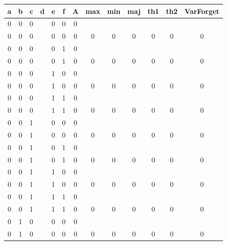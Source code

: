 \begin{table}[!tb]
    \centering
    \begin{tabular}{|c|c|c|c|c|c|c|c|c|c|c|c|c|}
        \hline
        \textbf{a} & \textbf{b} & \textbf{c} & \textbf{d} & \textbf{e} & \textbf{f} & \textbf{A} & \textbf{max} & \textbf{min} & \textbf{maj} & \textbf{th1} & \textbf{th2} & \textbf{VarForget} \\ \hline
        \rowcolor{gray!40} 0 & 0 & 0 &  & 0 & 0 & 0 &  &  &  &  &  &  \\ \hline
        \rowcolor{gray!40} 0 & 0 & 0 &  & 0 & 0 & 0 & 0 & 0 & 0 & 0 & 0 & 0 \\ \hline
        \rowcolor{blue!40} 0 & 0 & 0 &  & 0 & 1 & 0 &  &  &  &  &  &  \\ \hline
        \rowcolor{blue!40} 0 & 0 & 0 &  & 0 & 1 & 0 & 0 & 0 & 0 & 0 & 0 & 0 \\ \hline
        \rowcolor{red!40} 0 & 0 & 0 &  & 1 & 0 & 0 &  &  &  &  &  &  \\ \hline
        \rowcolor{red!40} 0 & 0 & 0 &  & 1 & 0 & 0 & 0 & 0 & 0 & 0 & 0 & 0 \\ \hline
        \rowcolor{green!40} 0 & 0 & 0 &  & 1 & 1 & 0 &  &  &  &  &  &  \\ \hline
        \rowcolor{green!40} 0 & 0 & 0 &  & 1 & 1 & 0 & 0 & 0 & 0 & 0 & 0 & 0 \\ \hline
        \rowcolor{yellow!40} 0 & 0 & 1 &  & 0 & 0 & 0 &  &  &  &  &  &  \\ \hline
        \rowcolor{yellow!40} 0 & 0 & 1 &  & 0 & 0 & 0 & 0 & 0 & 0 & 0 & 0 & 0 \\ \hline
        \rowcolor{gray!40} 0 & 0 & 1 &  & 0 & 1 & 0 &  &  &  &  &  &  \\ \hline
        \rowcolor{gray!40} 0 & 0 & 1 &  & 0 & 1 & 0 & 0 & 0 & 0 & 0 & 0 & 0 \\ \hline
        \rowcolor{blue!40} 0 & 0 & 1 &  & 1 & 0 & 0 &  &  &  &  &  &  \\ \hline
        \rowcolor{blue!40} 0 & 0 & 1 &  & 1 & 0 & 0 & 0 & 0 & 0 & 0 & 0 & 0 \\ \hline
        \rowcolor{red!40} 0 & 0 & 1 &  & 1 & 1 & 0 &  &  &  &  &  &  \\ \hline
        \rowcolor{red!40} 0 & 0 & 1 &  & 1 & 1 & 0 & 0 & 0 & 0 & 0 & 0 & 0 \\ \hline
        \rowcolor{green!40} 0 & 1 & 0 &  & 0 & 0 & 0 &  &  &  &  &  &  \\ \hline
        \rowcolor{green!40} 0 & 1 & 0 &  & 0 & 0 & 0 & 0 & 0 & 0 & 0 & 0 & 0 \\ \hline

\end{tabular}
\end{table}

